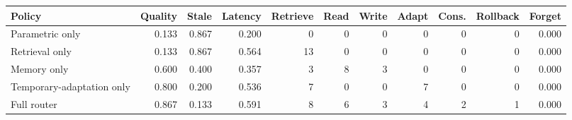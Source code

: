 \begin{tabular}{lrrrrrrrrrr}
\toprule
Policy & Quality & Stale & Latency & Retrieve & Read & Write & Adapt & Cons. & Rollback & Forget \\
\midrule
Parametric only & 0.133 & 0.867 & 0.200 & 0 & 0 & 0 & 0 & 0 & 0 & 0.000 \\
Retrieval only & 0.133 & 0.867 & 0.564 & 13 & 0 & 0 & 0 & 0 & 0 & 0.000 \\
Memory only & 0.600 & 0.400 & 0.357 & 3 & 8 & 3 & 0 & 0 & 0 & 0.000 \\
Temporary-adaptation only & 0.800 & 0.200 & 0.536 & 7 & 0 & 0 & 7 & 0 & 0 & 0.000 \\
Full router & 0.867 & 0.133 & 0.591 & 8 & 6 & 3 & 4 & 2 & 1 & 0.000 \\
\bottomrule
\end{tabular}
